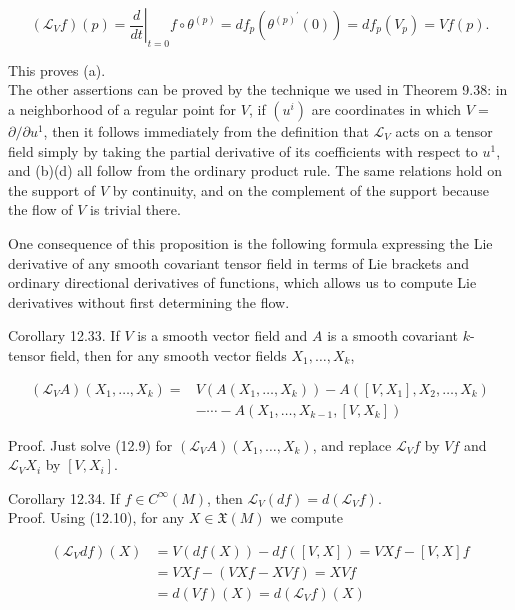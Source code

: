 \documentclass[10pt, letterpaper]{article}
\begin{document}
$$
\left(\mathscr{L}_{V} f\right)(p)=\left.\frac{d}{d t}\right|_{t=0} f \circ \theta^{(p)}=d f_{p}\left(\theta^{(p)^{\prime}}(0)\right)=d f_{p}\left(V_{p}\right)=V f(p) .
$$

This proves (a).\\
The other assertions can be proved by the technique we used in Theorem 9.38: in a neighborhood of a regular point for $V$, if $\left(u^{i}\right)$ are coordinates in which $V=$ $\partial / \partial u^{1}$, then it follows immediately from the definition that $\mathscr{L}_{V}$ acts on a tensor field simply by taking the partial derivative of its coefficients with respect to $u^{1}$, and (b)(d) all follow from the ordinary product rule. The same relations hold on the support of $V$ by continuity, and on the complement of the support because the flow of $V$ is trivial there.

One consequence of this proposition is the following formula expressing the Lie derivative of any smooth covariant tensor field in terms of Lie brackets and ordinary directional derivatives of functions, which allows us to compute Lie derivatives without first determining the flow.

Corollary 12.33. If $V$ is a smooth vector field and $A$ is a smooth covariant $k$-tensor field, then for any smooth vector fields $X_{1}, \ldots, X_{k}$,

$$
\begin{aligned}
\left(\mathscr{L}_{V} A\right)\left(X_{1}, \ldots, X_{k}\right)= & V\left(A\left(X_{1}, \ldots, X_{k}\right)\right)-A\left(\left[V, X_{1}\right], X_{2}, \ldots, X_{k}\right) \\
& -\cdots-A\left(X_{1}, \ldots, X_{k-1},\left[V, X_{k}\right]\right)
\end{aligned}
$$

Proof. Just solve (12.9) for $\left(\mathscr{L}_{V} A\right)\left(X_{1}, \ldots, X_{k}\right)$, and replace $\mathscr{L}_{V} f$ by $V f$ and $\mathscr{L}_{V} X_{i}$ by $\left[V, X_{i}\right]$.

Corollary 12.34. If $f \in C^{\infty}(M)$, then $\mathscr{L}_{V}(d f)=d\left(\mathscr{L}_{V} f\right)$.\\
Proof. Using (12.10), for any $X \in \mathfrak{X}(M)$ we compute

$$
\begin{aligned}
\left(\mathscr{L}_{V} d f\right)(X) & =V(d f(X))-d f([V, X])=V X f-[V, X] f \\
& =V X f-(V X f-X V f)=X V f \\
& =d(V f)(X)=d\left(\mathscr{L}_{V} f\right)(X)
\end{aligned}
$$
\end{document}
